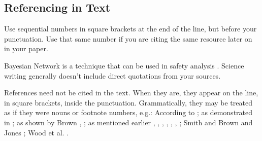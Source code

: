 \subsection{Referencing in Text}
\label{sec:ref-in-text}

Use sequential numbers in square brackets at the end of the line, but before your punctuation. Use that same number if you are citing the same resource later on in your paper.

Bayesian Network is a technique that can be used in safety analysis \cite{leicester2023}. Science writing generally doesn't include direct quotations from your sources.

References need not be cited in the text. When they are, they appear on the line, in square brackets, inside the punctuation. Grammatically, they may be treated as if they were nouns or footnote numbers, e.g.: According to \cite{cmu2022}; as demonstrated in \cite{hawaii2023}; as shown by Brown \cite{harvard2023}, \cite{creswell2018}; as mentioned earlier \cite{bera2018}, \cite{purdue2023}, \cite{manchester2022}, \cite{kumar2019}, \cite{murray2002}, \cite{lester2015}, \cite{bowen1992}; Smith \cite{harvard2023} and Brown and Jones \cite{creswell2018}; Wood et al. \cite{saunders2019}.

